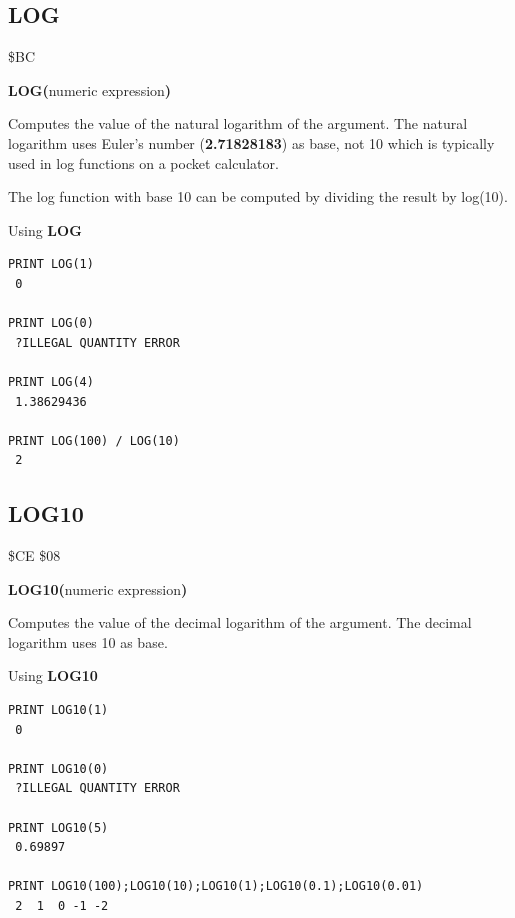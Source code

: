 
\newpage
\subsection{LOG}
\begin{description}[leftmargin=2cm,style=nextline]
\item [Token:] \$BC
\item [Format:] {\bf LOG(}numeric expression{\bf)}
\item [Usage:] Computes
               the value of the natural logarithm of the argument.
               The natural logarithm uses
               Euler's number ({\bf 2.71828183}) as base,
               not 10 which is typically used
               in log functions on a pocket calculator.

\item [Remarks:] The log function with base 10 can be computed
                 by dividing the result by log(10).
\item [Example:] Using {\bf LOG}
\begin{tcolorbox}[colback=black,coltext=white]
\verbatimfont{\codefont}
\begin{verbatim}
PRINT LOG(1)
 0

PRINT LOG(0)
 ?ILLEGAL QUANTITY ERROR

PRINT LOG(4)
 1.38629436

PRINT LOG(100) / LOG(10)
 2
\end{verbatim}
\end{tcolorbox}
\end{description}


\newpage
\subsection{LOG10}
\begin{description}[leftmargin=2cm,style=nextline]
\item [Token:] \$CE \$08
\item [Format:] {\bf LOG10(}numeric expression{\bf)}
\item [Usage:] Computes
               the value of the decimal logarithm of the argument.
               The decimal logarithm uses 10 as base.

\item [Example:] Using {\bf LOG10}
\begin{tcolorbox}[colback=black,coltext=white]
\verbatimfont{\codefont}
\begin{verbatim}
PRINT LOG10(1)
 0

PRINT LOG10(0)
 ?ILLEGAL QUANTITY ERROR

PRINT LOG10(5)
 0.69897

PRINT LOG10(100);LOG10(10);LOG10(1);LOG10(0.1);LOG10(0.01)
 2  1  0 -1 -2
\end{verbatim}
\end{tcolorbox}
\end{description}

